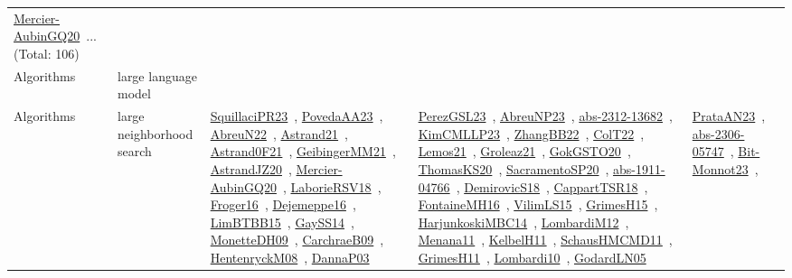 {\begin{longtable}{lp{3cm}>{\raggedright\arraybackslash}p{6cm}>{\raggedright\arraybackslash}p{6cm}>{\raggedright\arraybackslash}p{8cm}}
\href{../works/Mercier-AubinGQ20.pdf}{Mercier-AubinGQ20}~\cite{Mercier-AubinGQ20}... (Total: 106)\\
Algorithms & large language model &  &  & \\
Algorithms & large neighborhood search & \href{../works/SquillaciPR23.pdf}{SquillaciPR23}~\cite{SquillaciPR23}, \href{../works/PovedaAA23.pdf}{PovedaAA23}~\cite{PovedaAA23}, \href{../works/AbreuN22.pdf}{AbreuN22}~\cite{AbreuN22}, \href{../works/Astrand21.pdf}{Astrand21}~\cite{Astrand21}, \href{../works/Astrand0F21.pdf}{Astrand0F21}~\cite{Astrand0F21}, \href{../works/GeibingerMM21.pdf}{GeibingerMM21}~\cite{GeibingerMM21}, \href{../works/AstrandJZ20.pdf}{AstrandJZ20}~\cite{AstrandJZ20}, \href{../works/Mercier-AubinGQ20.pdf}{Mercier-AubinGQ20}~\cite{Mercier-AubinGQ20}, \href{../works/LaborieRSV18.pdf}{LaborieRSV18}~\cite{LaborieRSV18}, \href{../works/Froger16.pdf}{Froger16}~\cite{Froger16}, \href{../works/Dejemeppe16.pdf}{Dejemeppe16}~\cite{Dejemeppe16}, \href{../works/LimBTBB15.pdf}{LimBTBB15}~\cite{LimBTBB15}, \href{../works/GaySS14.pdf}{GaySS14}~\cite{GaySS14}, \href{../works/MonetteDH09.pdf}{MonetteDH09}~\cite{MonetteDH09}, \href{../works/CarchraeB09.pdf}{CarchraeB09}~\cite{CarchraeB09}, \href{../works/HentenryckM08.pdf}{HentenryckM08}~\cite{HentenryckM08}, \href{../works/DannaP03.pdf}{DannaP03}~\cite{DannaP03} & \href{../works/PerezGSL23.pdf}{PerezGSL23}~\cite{PerezGSL23}, \href{../works/AbreuNP23.pdf}{AbreuNP23}~\cite{AbreuNP23}, \href{../works/abs-2312-13682.pdf}{abs-2312-13682}~\cite{abs-2312-13682}, \href{../works/KimCMLLP23.pdf}{KimCMLLP23}~\cite{KimCMLLP23}, \href{../works/ZhangBB22.pdf}{ZhangBB22}~\cite{ZhangBB22}, \href{../works/ColT22.pdf}{ColT22}~\cite{ColT22}, \href{../works/Lemos21.pdf}{Lemos21}~\cite{Lemos21}, \href{../works/Groleaz21.pdf}{Groleaz21}~\cite{Groleaz21}, \href{../works/GokGSTO20.pdf}{GokGSTO20}~\cite{GokGSTO20}, \href{../works/ThomasKS20.pdf}{ThomasKS20}~\cite{ThomasKS20}, \href{../works/SacramentoSP20.pdf}{SacramentoSP20}~\cite{SacramentoSP20}, \href{../works/abs-1911-04766.pdf}{abs-1911-04766}~\cite{abs-1911-04766}, \href{../works/DemirovicS18.pdf}{DemirovicS18}~\cite{DemirovicS18}, \href{../works/CappartTSR18.pdf}{CappartTSR18}~\cite{CappartTSR18}, \href{../works/FontaineMH16.pdf}{FontaineMH16}~\cite{FontaineMH16}, \href{../works/VilimLS15.pdf}{VilimLS15}~\cite{VilimLS15}, \href{../works/GrimesH15.pdf}{GrimesH15}~\cite{GrimesH15}, \href{../works/HarjunkoskiMBC14.pdf}{HarjunkoskiMBC14}~\cite{HarjunkoskiMBC14}, \href{../works/LombardiM12.pdf}{LombardiM12}~\cite{LombardiM12}, \href{../works/Menana11.pdf}{Menana11}~\cite{Menana11}, \href{../works/KelbelH11.pdf}{KelbelH11}~\cite{KelbelH11}, \href{../works/SchausHMCMD11.pdf}{SchausHMCMD11}~\cite{SchausHMCMD11}, \href{../works/GrimesH11.pdf}{GrimesH11}~\cite{GrimesH11}, \href{../works/Lombardi10.pdf}{Lombardi10}~\cite{Lombardi10}, \href{../works/GodardLN05.pdf}{GodardLN05}~\cite{GodardLN05} & \href{../works/PrataAN23.pdf}{PrataAN23}~\cite{PrataAN23}, \href{../works/abs-2306-05747.pdf}{abs-2306-05747}~\cite{abs-2306-05747}, \href{../works/Bit-Monnot23.pdf}{Bit-Monnot23}~\cite{Bit-Monnot23}, 
\end{longtable}}
